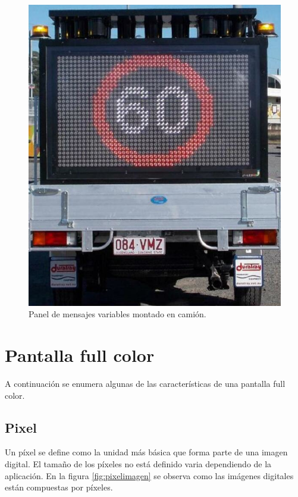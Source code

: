 \begin{figure}[htpb]
	\centering
	\includegraphics[scale=1]{../Figures/vmstruck.png} 
	\caption{Panel de mensajes variables montado en camión\protect\footnotemark.}
	\label{fig:vmsc}
\end{figure}


\section{Pantalla full color}
A continuación se enumera algunas de las características de una pantalla full color.
\subsection{Pixel}
Un píxel se define como la unidad más básica que forma parte de una imagen digital.
El tamaño de los píxeles no está definido varia dependiendo de la aplicación\citep{IMAGENDEF}. En la figura \ref{fig:pixelimagen} se observa como las imágenes digitales están compuestas por píxeles.

